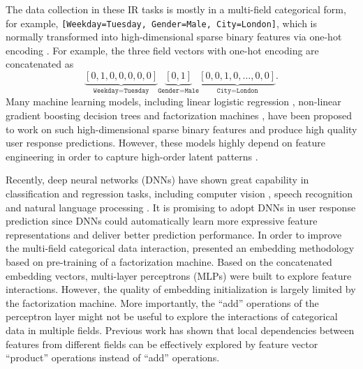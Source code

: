 \documentclass[conference]{IEEEtran}
\begin{document}
The data collection in these IR tasks is mostly in a multi-field categorical form, for example, \texttt{[Weekday=Tuesday, Gender=Male, City=London]}, which is normally transformed into high-dimensional sparse binary features via one-hot encoding \cite{he2014practical}.
For example, the three field vectors with one-hot encoding are concatenated as
\[ \underbrace{[0,1,0,0,0,0,0]}_{\texttt{Weekday=Tuesday}}\underbrace{[0,1]}_{\texttt{Gender=Male}} \underbrace{[0,0,1,0,\ldots,0,0]}_{\texttt{City=London}}.\]
Many machine learning models, including linear logistic regression \cite{lee2012estimating}, non-linear gradient boosting decision trees \cite{he2014practical} and factorization machines \cite{ta2015factorization}, have been proposed to work on such high-dimensional sparse binary features and produce high quality user response predictions.
However, these models highly depend on feature engineering in order to capture high-order latent patterns \cite{cui2011bid}.

Recently, deep neural networks (DNNs) \cite{lecun2015deep} have shown great capability in classification and regression tasks, including computer vision \cite{krizhevsky2012imagenet}, speech recognition \cite{graves2013speech} and natural language processing \cite{mikolov2013distributed}. It is promising to adopt DNNs in user response prediction since DNNs could automatically learn more expressive feature representations and deliver better prediction performance.
In order to improve the multi-field categorical data interaction, \cite{zhang2016deep} presented an embedding methodology based on pre-training of a factorization machine. Based on the concatenated embedding vectors, multi-layer perceptrons (MLPs) were built to explore feature interactions. However, the quality of embedding initialization is largely limited by the factorization machine.
More importantly, the ``add'' operations of the perceptron layer might not be useful to explore the interactions of categorical data in multiple fields. Previous work \cite{menon2011response,ta2015factorization} has shown that local dependencies between features from different fields can be effectively explored by feature vector ``product'' operations instead of ``add'' operations.
\end{document}
